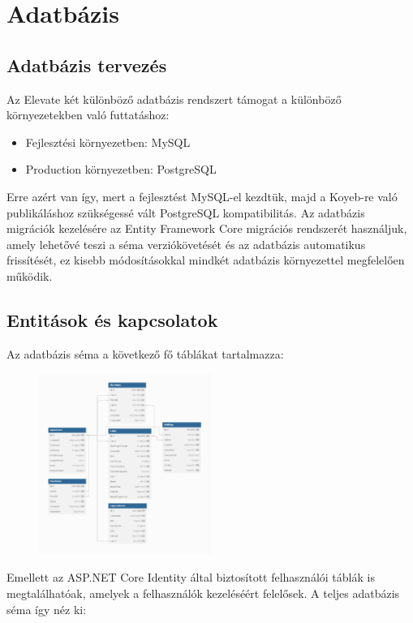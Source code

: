 \documentclass[12pt]{report}
\begin{document}
\chapter{Adatbázis}
\section{Adatbázis tervezés}
Az Elevate két különböző adatbázis rendszert támogat a különböző környezetekben való futtatáshoz:
\begin{itemize}
  \item Fejlesztési környezetben: MySQL
  \item Production környezetben: PostgreSQL
\end{itemize}

Erre azért van így, mert a fejlesztést MySQL-el kezdtük, majd a Koyeb-re való publikáláshoz szükségessé vált PostgreSQL kompatibilitás. Az adatbázis migrációk kezelésére az Entity Framework Core migrációs rendszerét használjuk, amely lehetővé teszi a séma verziókövetését és az adatbázis automatikus frissítését, ez kisebb módosításokkal mindkét adatbázis környezettel megfelelően működik.

\section{Entitások és kapcsolatok}
Az adatbázis séma a következő fő táblákat tartalmazza:

\begin{figure}[H]
    \centering
    \includegraphics[width=0.5\textwidth, height=0.5\textheight, keepaspectratio]{src/diagram_min.png}
\end{figure}

Emellett az ASP.NET Core Identity által biztosított felhasználói táblák is megtalálhatóak, amelyek a felhasználók kezeléséért felelősek. A teljes adatbázis séma így néz ki:
\end{document}
